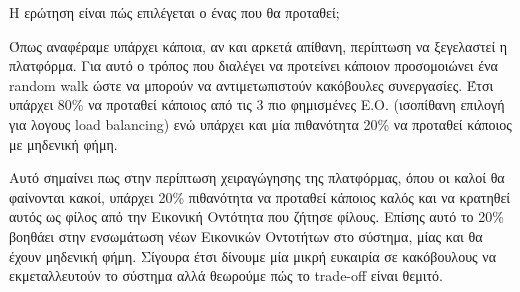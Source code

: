 Η ερώτηση είναι πώς επιλέγεται ο ένας που θα προταθεί;

Όπως αναφέραμε υπάρχει κάποια, αν και αρκετά απίθανη, περίπτωση να ξεγελαστεί η πλατφόρμα. Για αυτό ο τρόπος που διαλέγει να προτείνει κάποιον προσομοιώνει ένα random walk ώστε να μπορούν να αντιμετωπιστούν κακόβουλες συνεργασίες. Έτσι υπάρχει 80\% να προταθεί κάποιος από τις 3 πιο φημισμένες Ε.Ο. (ισοπίθανη επιλογή για λογους load balancing) ενώ υπάρχει και μία πιθανότητα 20\% να προταθεί κάποιος με μηδενική φήμη.

Αυτό σημαίνει πως στην περίπτωση χειραγώγησης της πλατφόρμας, όπου οι καλοί θα φαίνονται κακοί, υπάρχει 20\% πιθανότητα να προταθεί κάποιος καλός και να  κρατηθεί αυτός ως φίλος από την Εικονική Οντότητα που ζήτησε φίλους. Επίσης αυτό το 20\% βοηθάει στην ενσωμάτωση νέων Εικονικών Οντοτήτων στο σύστημα, μίας και θα έχουν μηδενική φήμη.
Σίγουρα έτσι δίνουμε μία μικρή ευκαιρία σε κακόβουλους να εκμεταλλευτούν το σύστημα αλλά θεωρούμε πώς το trade-off είναι θεμιτό.



